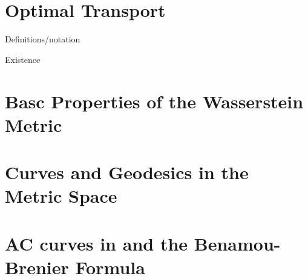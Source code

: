 \documentclass[oneside,reqno,letterpaper]{amsart}
\title[]{}
\author{Aden Chen}
\begin{document}
\maketitle

\tableofcontents

\section{Optimal Transport}
Definitions/notation

Existence

\section{Basc Properties of the Wasserstein Metric}

\section{Curves and Geodesics in the Metric Space}

\section{AC curves in and the Benamou-Brenier Formula}
\end{document}
